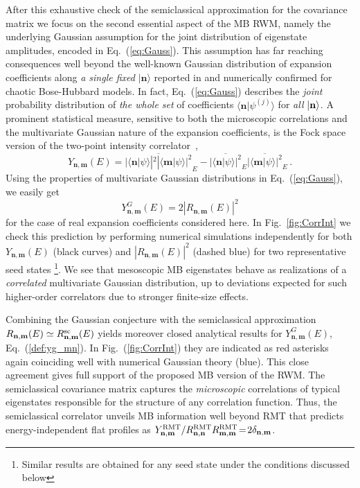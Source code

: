 \documentclass[prl,a4paper,twocolumn,superscriptaddress,floatfix]{revtex4-1}%
\begin{document}
After this exhaustive check of the semiclassical approximation for the covariance matrix we focus on the second essential aspect of the MB RWM, namely the underlying Gaussian assumption for the joint distribution of eigenstate amplitudes, encoded in Eq.~(\ref{eq:Gauss}). This assumption has far reaching consequences well beyond the well-known Gaussian distribution of expansion coefficients along {\it a single fixed} $|{\mathbf n}\rangle$ reported in \cite{atas2017quantum,nakerst2021eigenstate} and numerically confirmed \cite{suppmat} for chaotic Bose-Hubbard models. In fact, Eq.~(\ref{eq:Gauss}) describes the {\it joint} probability distribution of {\it the whole set} of coefficients $\langle {\mathbf n}|\psi^{(j)}\rangle$ for {\it all} $|{\bf n}\rangle$. A prominent statistical measure, sensitive to both the microscopic correlations and the multivariate Gaussian nature of the  expansion coefficients, is the Fock space version of the two-point intensity correlator~\cite{MIRLIN2000},
\begin{equation}
Y_{{\mathbf n},{\mathbf m}}(E)=\overline{|\langle {\mathbf n}|\psi\rangle|^{2}|\langle {\mathbf m}|\psi\rangle|^{2}}_{E}-\overline{|\langle {\mathbf n}|\psi\rangle|^{2}}_{E} \overline{|\langle {\mathbf m}|\psi\rangle|^{2}}_{E}  \, .
\label{def:y_mn}
\end{equation}
Using the properties of multivariate Gaussian distributions in Eq.~(\ref{eq:Gauss}), we easily get \cite{suppmat}
\begin{equation}
Y_{{\mathbf n},{\mathbf m}}^{G}(E)=2|R_{{\mathbf n},{\mathbf m}}(E)|^{2} \label{def:yg_mn}
\end{equation}
for the case of real expansion coefficients considered here. In Fig.~\ref{fig:CorrInt} we check this prediction by performing  numerical simulations independently for both 
$Y_{{\mathbf n},{\mathbf m}}(E)$ (black curves) and $|R_{{\mathbf n},{\mathbf m}}(E)|^2$ (dashed blue) for two representative seed states \footnote{Similar results are obtained for any seed state under the conditions discussed below}. We see that mesoscopic MB eigenstates behave as realizations of a {\it correlated} multivariate Gaussian distribution, up to deviations expected for such higher-order correlators due to stronger finite-size effects.

Combining the Gaussian conjecture with the semiclassical approximation $R_{{\mathbf n},{\mathbf m}}(E)\simeq R^{\rm sc}_{{\mathbf n},{\mathbf m}}(E)$ yields moreover closed analytical results for
$Y_{{\mathbf n},{\mathbf m}}^{G}(E)$, 
Eq.~(\ref{def:yg_mn}). In Fig.~(\ref{fig:CorrInt}) they are 
indicated as red asterisks again coinciding well with numerical Gaussian theory (blue).
This close agreement gives full support of the proposed MB version of the RWM. The semiclassical covariance matrix captures the \emph{microscopic} correlations of typical eigenstates responsible for the structure of any correlation function. Thus, the semiclassical correlator unveils MB information well beyond RMT that predicts energy-independent flat profiles as $Y^{\rm RMT}_{{\mathbf n},{\mathbf m}}/R^{{\rm RMT}}_{{\bf n},{\bf n}}R^{{\rm RMT}}_{{\bf m},{\bf m}}\!=\!2\delta_{{\mathbf n},{\mathbf m}}$.
\end{document}
